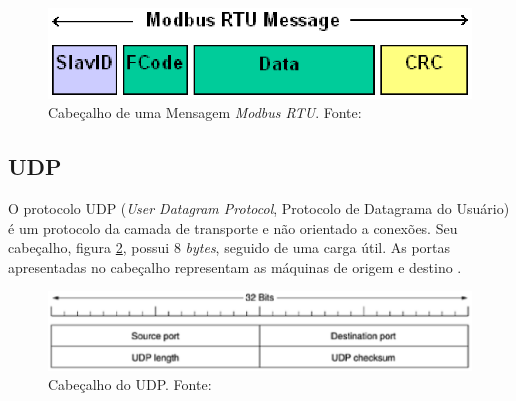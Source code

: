    \begin{figure}[!htpb]
        \centering
        \includegraphics[keepaspectratio=true,scale=0.8]{figuras/modbusrtuheader.eps}
        \caption{Cabeçalho de uma Mensagem \textit{Modbus RTU}. Fonte: \cite{modbus_online}}
        \label{modbusrtuheader}
    \end{figure}

    \subsection{UDP}
    O protocolo UDP (\textit{User Datagram Protocol}, Protocolo de Datagrama do Usuário) é um protocolo da camada de transporte e não orientado a conexões. Seu cabeçalho, figura \ref{udp_header}, possui 8 \textit{bytes}, seguido de uma carga útil. As portas apresentadas no cabeçalho representam as máquinas de origem e destino \cite{tanenbaum_2002}.

    \begin{figure}[!htpb]
        \centering
        \includegraphics[keepaspectratio=true,scale=0.8]{figuras/udp_header.eps}
        \caption{Cabeçalho do UDP. Fonte: \cite{tanenbaum_2002}}
        \label{udp_header}
    \end{figure}
